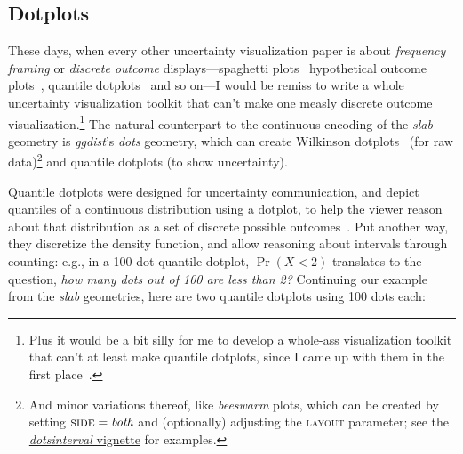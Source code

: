 \documentclass[journal]{vgtc}                     %
\begin{document}
\subsection{Dotplots}
\label{sec:dotplots}

These days, when every other uncertainty visualization paper is about \textit{frequency framing} or \textit{discrete outcome} displays---spaghetti plots~\cite{cox2013visualizing,liu2018visualizing} hypothetical outcome plots~\cite{hullman2015hypothetical,kale2018hypothetical}, quantile dotplots~\cite{kay2016ish,fernandes2018uncertainty} and so on---I would be remiss to write a whole uncertainty visualization toolkit that can't make one measly discrete outcome visualization.\footnote{Plus it would be a bit silly for me to develop a whole-ass visualization toolkit that can't at least make quantile dotplots, since I came up with them in the first place~\cite{kay2016ish}.} The natural counterpart to the continuous encoding of the \textit{slab} geometry is \textit{ggdist}'s \textit{dots} geometry, which can create Wilkinson dotplots~\cite{wilkinson1999dot} (for raw data)\footnote{And minor variations thereof, like \textit{beeswarm} plots, which can be created by setting $\textsc{side} = \textit{both}$ and (optionally) adjusting the \textsc{layout} parameter; see the \href{https://mjskay.github.io/ggdist/articles/dotsinterval.html}{\textit{dotsinterval} vignette} for examples.} and quantile dotplots (to show uncertainty).

Quantile dotplots were designed for uncertainty communication, and depict quantiles of a continuous distribution using a dotplot, to help the viewer reason about that distribution as a set of discrete possible outcomes~\cite{kay2016ish}. Put another way, they discretize the density function, and allow reasoning about intervals through counting: e.g., in a 100-dot quantile dotplot, $\Pr(X < 2)$ translates to the question, \textit{how many dots out of 100 are less than 2?} Continuing our example from the \textit{slab} geometries, here are two quantile dotplots using 100 dots each:
\end{document}
